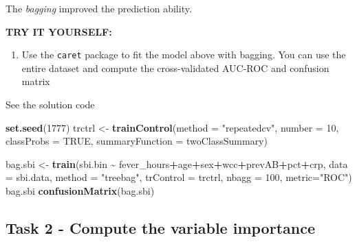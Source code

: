 \documentclass[
]{book}
\newenvironment{Shaded}{\begin{snugshade}}{\end{snugshade}}
\newcommand{\AttributeTok}[1]{\textcolor[rgb]{0.13,0.29,0.53}{#1}}
\newcommand{\ConstantTok}[1]{\textcolor[rgb]{0.56,0.35,0.01}{#1}}
\newcommand{\DecValTok}[1]{\textcolor[rgb]{0.00,0.00,0.81}{#1}}
\newcommand{\FunctionTok}[1]{\textcolor[rgb]{0.13,0.29,0.53}{\textbf{#1}}}
\newcommand{\NormalTok}[1]{#1}
\newcommand{\OtherTok}[1]{\textcolor[rgb]{0.56,0.35,0.01}{#1}}
\newcommand{\SpecialCharTok}[1]{\textcolor[rgb]{0.81,0.36,0.00}{\textbf{#1}}}
\newcommand{\StringTok}[1]{\textcolor[rgb]{0.31,0.60,0.02}{#1}}
\providecommand{\tightlist}{%
  \setlength{\itemsep}{0pt}\setlength{\parskip}{0pt}}
\begin{document}
The \emph{bagging} improved the prediction ability.

\textbf{TRY IT YOURSELF:}

\begin{enumerate}
\def\labelenumi{\arabic{enumi})}
\tightlist
\item
  Use the \texttt{caret} package to fit the model above with bagging. You can use
  the entire dataset and compute the cross-validated AUC-ROC and confusion matrix
\end{enumerate}

See the solution code

\begin{Shaded}
\begin{Highlighting}[]
\FunctionTok{set.seed}\NormalTok{(}\DecValTok{1777}\NormalTok{)}
\NormalTok{trctrl      }\OtherTok{\textless{}{-}} \FunctionTok{trainControl}\NormalTok{(}\AttributeTok{method =} \StringTok{"repeatedcv"}\NormalTok{, }
                            \AttributeTok{number =} \DecValTok{10}\NormalTok{,}
                             \AttributeTok{classProbs =} \ConstantTok{TRUE}\NormalTok{,  }
                            \AttributeTok{summaryFunction =}\NormalTok{ twoClassSummary)}

\NormalTok{bag.sbi    }\OtherTok{\textless{}{-}} \FunctionTok{train}\NormalTok{(sbi.bin }\SpecialCharTok{\textasciitilde{}}\NormalTok{ fever\_hours}\SpecialCharTok{+}\NormalTok{age}\SpecialCharTok{+}\NormalTok{sex}\SpecialCharTok{+}\NormalTok{wcc}\SpecialCharTok{+}\NormalTok{prevAB}\SpecialCharTok{+}\NormalTok{pct}\SpecialCharTok{+}\NormalTok{crp,}
                            \AttributeTok{data =}\NormalTok{ sbi.data,}
                            \AttributeTok{method =} \StringTok{"treebag"}\NormalTok{,}
                            \AttributeTok{trControl =}\NormalTok{ trctrl,}
                            \AttributeTok{nbagg =} \DecValTok{100}\NormalTok{,}
                            \AttributeTok{metric=}\StringTok{"ROC"}\NormalTok{)}
\NormalTok{bag.sbi}
\FunctionTok{confusionMatrix}\NormalTok{(bag.sbi)}
\end{Highlighting}
\end{Shaded}

\subsection*{Task 2 - Compute the variable importance}\label{task-2---compute-the-variable-importance}
\end{document}
